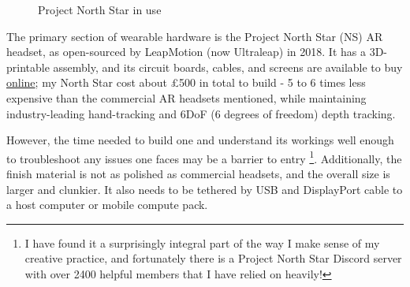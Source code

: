 \begin{figure}
    \centering
    
    \caption{Project North Star in use}
\end{figure}

The primary section of wearable hardware is the Project North Star (NS) AR headset, as open-sourced by LeapMotion (now Ultraleap) in 2018. It has a 3D-printable assembly, and its circuit boards, cables, and screens are available to buy \href{https://docs.projectnorthstar.org}{online}; my North Star cost about £500 in total to build - 5 to 6 times less expensive than the commercial AR headsets mentioned, while maintaining industry-leading hand-tracking and 6DoF (6 degrees of freedom) depth tracking.

However, the time needed to build one and understand its workings well enough to trouble\-shoot any issues one faces may be a barrier to entry \footnote{I have found it a surprisingly integral part of the way I make sense of my creative practice, and fortunately there is a Project North Star Discord server with over 2400 helpful members that I have relied on heavily!}. Additionally, the finish material is not as polished as commercial headsets, and the overall size is larger and clunkier. It also needs to be tethered by USB and DisplayPort cable to a host computer or mobile compute pack.

